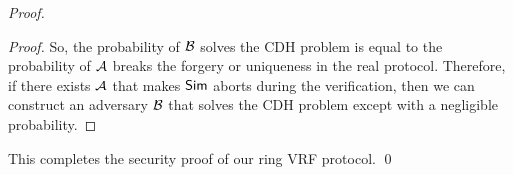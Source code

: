 \begin{proof}
\begin{proof}
			So, the probability of $ \mathcal{B} $ solves the CDH problem is equal to the probability of $ \mathcal{A} $ breaks the forgery or uniqueness in the real protocol. Therefore,  if there exists $ \mathcal{A} $ that makes $ \mathsf{Sim}$ aborts during the verification, then we can construct an adversary $ \mathcal{B} $ that solves the CDH problem except with a negligible probability.
			
			
				  
		\end{proof}
		This completes the security proof of our ring VRF protocol. \qed
	\end{proof}


